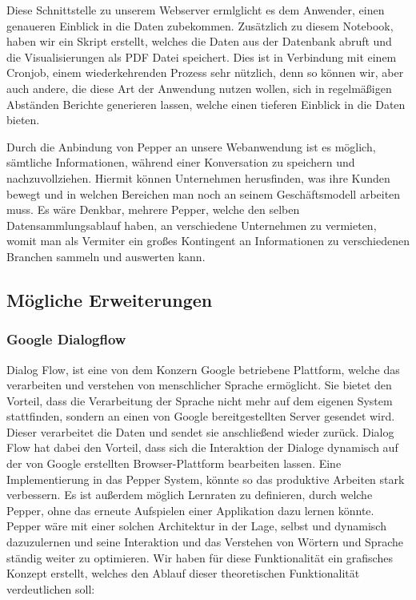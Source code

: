 Diese Schnittstelle zu unserem Webserver ermlglicht es dem Anwender, einen genaueren Einblick in die Daten zubekommen. Zusätzlich zu diesem Notebook, haben wir ein Skript erstellt, welches die Daten aus der Datenbank abruft und die Visualisierungen als PDF Datei speichert. Dies ist in Verbindung mit einem Cronjob, einem wiederkehrenden Prozess sehr nützlich, denn so können wir, aber auch andere, die diese Art der Anwendung nutzen wollen, sich in regelmäßigen Abständen Berichte generieren lassen, welche einen tieferen Einblick in die Daten bieten.

Durch die Anbindung von Pepper an unsere Webanwendung ist es möglich, sämtliche Informationen, während einer Konversation zu speichern und nachzuvollziehen. Hiermit können Unternehmen herusfinden, was ihre Kunden bewegt und in welchen Bereichen man noch an seinem Geschäftsmodell arbeiten muss. Es wäre Denkbar, mehrere Pepper, welche den selben Datensammlungsablauf haben, an verschiedene Unternehmen zu vermieten, womit man als Vermiter ein großes Kontingent an Informationen zu verschiedenen Branchen sammeln und auswerten kann.\\

\subsection{Mögliche Erweiterungen}

\subsubsection{Google Dialogflow}

Dialog Flow, ist eine von dem Konzern Google betriebene Plattform, welche das verarbeiten und verstehen von menschlicher Sprache ermöglicht. Sie bietet den Vorteil, dass die Verarbeitung der Sprache nicht mehr auf dem eigenen System stattfinden, sondern an einen von Google bereitgestellten Server gesendet wird. Dieser verarbeitet die Daten und sendet sie anschließend wieder zurück. Dialog Flow hat dabei den Vorteil, dass sich die Interaktion der Dialoge dynamisch auf der von Google erstellten Browser-Plattform bearbeiten lassen. Eine Implementierung in das Pepper System, könnte so das produktive Arbeiten stark verbessern. Es ist außerdem möglich Lernraten zu definieren, durch welche Pepper, ohne das erneute Aufspielen einer Applikation dazu lernen könnte. Pepper wäre mit einer solchen Architektur in der Lage, selbst und dynamisch dazuzulernen und seine Interaktion und das Verstehen von Wörtern und Sprache ständig weiter zu optimieren. Wir haben für diese Funktionalität ein grafisches Konzept erstellt, welches den Ablauf dieser theoretischen Funktionalität verdeutlichen soll:



